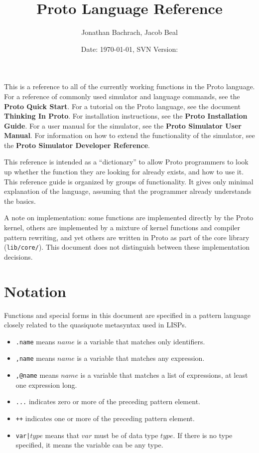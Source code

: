 \documentclass{article}
\title{Proto Language Reference}
\author{Jonathan Bachrach, Jacob Beal}
\date{Date: \today, SVN Version: \svnrev{}}
\newcommand\type[1]{$#1$}
\begin{document}
\maketitle

This is a reference to all of the currently working functions in the
Proto language.  For a reference of commonly used simulator and
language commands, see the {\bf Proto Quick Start}.  For a tutorial on
the Proto language, see the document {\bf Thinking In Proto}.  For
installation instructions, see the {\bf Proto Installation Guide}.
For a user manual for the simulator, see the {\bf Proto Simulator User
  Manual}.  For information on how to extend the functionality of the
simulator, see the {\bf Proto Simulator Developer Reference}.

This reference is intended as a ``dictionary'' to allow Proto
programmers to look up whether the function they are looking for
already exists, and how to use it.  This reference guide is organized
by groups of functionality.  It gives only minimal explanation of the
language, assuming that the programmer already understands the basics.

A note on implementation: some functions are implemented directly by
the Proto kernel, others are implemented by a mixture of kernel
functions and compiler pattern rewriting, and yet others are written
in Proto as part of the core library ({\tt lib/core/}).  This document
does not distinguish between these implementation decisions.




\section{Notation}

Functions and special forms in this document are specified in a
pattern language closely related to the quasiquote metasyntax used in
LISPs.
\begin{itemize}
\item {\tt .name} means $name$ is a variable that matches only identifiers. 
\item {\tt ,name} means $name$ is a variable that matches any expression.
\item {\tt ,@name} means $name$ is a variable that matches a list of
  expressions, at least one expression long.
\item {\tt ...} indicates zero or more of the preceding pattern element.
\item {\tt ++} indicates one or more of the preceding pattern element.
\item {\tt var|\type{type}} means that $var$ must be of data type
  $type$.  If there is no type specified, it means the variable can be
  any type.
\end{itemize}
\end{document}
